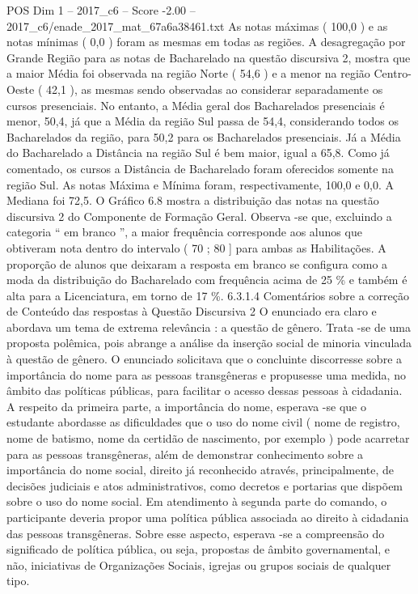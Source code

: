 \begin{textsample}{POS Dim 1 – 2017\_c6 – Score -2.00 – 2017\_c6/enade\_2017\_mat\_67a6a38461.txt}
As notas máximas ( 100,0 ) e as notas mínimas ( 0,0 ) foram as mesmas em todas as regiões.
A desagregação por Grande Região para as notas de Bacharelado na questão discursiva 2, mostra que a maior Média foi observada na região Norte ( 54,6 ) e a menor na região Centro-Oeste ( 42,1 ), as mesmas sendo observadas ao considerar separadamente os cursos presenciais.
No entanto, a Média geral dos Bacharelados presenciais é menor, 50,4, já que a Média da região Sul passa de 54,4, considerando todos os Bacharelados da região, para 50,2 para os Bacharelados presenciais.
Já a Média do Bacharelado a Distância na região Sul é bem maior, igual a 65,8.
Como já comentado, os cursos a Distância de Bacharelado foram oferecidos somente na região Sul.
As notas Máxima e Mínima foram, respectivamente, 100,0 e 0,0.
A Mediana foi 72,5.
O Gráfico 6.8 mostra a distribuição das notas na questão discursiva 2 do Componente de Formação Geral.
Observa -se que, excluindo a categoria “ em branco ”, a maior frequência corresponde aos alunos que obtiveram nota dentro do intervalo ( 70 ; 80 ] para ambas as Habilitações.
A proporção de alunos que deixaram a resposta em branco se configura como a moda da distribuição do Bacharelado com frequência acima de 25 \% e também é alta para a Licenciatura, em torno de 17 \%. 6.3.1.4 Comentários sobre a correção de Conteúdo das respostas à Questão Discursiva 2 O enunciado era claro e abordava um tema de extrema relevância : a questão de gênero.
Trata -se de uma proposta polêmica, pois abrange a análise da inserção social de minoria vinculada à questão de gênero.
O enunciado solicitava que o concluinte discorresse sobre a importância do nome para as pessoas transgêneras e propusesse uma medida, no âmbito das políticas públicas, para facilitar o acesso dessas pessoas à cidadania.
A respeito da primeira parte, a importância do nome, esperava -se que o estudante abordasse as dificuldades que o uso do nome civil ( nome de registro, nome de batismo, nome da certidão de nascimento, por exemplo ) pode acarretar para as pessoas transgêneras, além de demonstrar conhecimento sobre a importância do nome social, direito já reconhecido através, principalmente, de decisões judiciais e atos administrativos, como decretos e portarias que dispõem sobre o uso do nome social.
Em atendimento à segunda parte do comando, o participante deveria propor uma política pública associada ao direito à cidadania das pessoas transgêneras.
Sobre esse aspecto, esperava -se a compreensão do significado de política pública, ou seja, propostas de âmbito governamental, e não, iniciativas de Organizações Sociais, igrejas ou grupos sociais de qualquer tipo.

\end{textsample}
